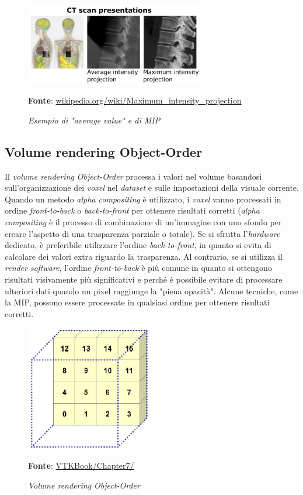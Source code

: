 \begin{figure}[h]
    \centering
    \includegraphics[width=0.7\textwidth]{immagini/volumerendering/mip.jpg}
    \caption{\textit{Esempio di "average value" e di MIP}}
    \textbf{Fonte}: \href{https://en.wikipedia.org/wiki/Maximum_intensity_projection}{wikipedia.org/wiki/Maximum\_intensity\_projection}
    \label{fig: Volume Rendering Example}
\end{figure}

\subsection{Volume rendering Object-Order}\label{sec:volume-object-order}
Il \emph{volume rendering Object-Order} processa i valori nel volume basandosi sull'organizzazione dei \emph{voxel} nel \emph{dataset} e sulle impostazioni della visuale corrente. Quando un metodo \emph{alpha compositing} è utilizzato, i \emph{voxel} vanno processati in ordine \emph{front-to-back} o \emph{back-to-front} per ottenere risultati corretti (\emph{alpha compositing} è il processo di combinazione di un'immagine con uno sfondo per creare l'aspetto di una trasparenza parziale o totale). Se si sfrutta l'\emph{hardware} dedicato, è preferibile utilizzare l'ordine \emph{back-to-front}, in quanto si evita di calcolare dei valori extra riguardo la trasparenza. Al contrario, se si utilizza il \emph{render} \emph{software}, l'ordine \emph{front-to-back} è più comune in quanto si ottengono risultati visivamente più significativi e perché è possibile evitare di processare ulteriori dati quando un pixel raggiunge la "piena opacità". Alcune tecniche, come la MIP, possono essere processate in qualsiasi ordine per ottenere risultati corretti.

\begin{figure}[h]
    \centering
    \includegraphics[width=0.5\textwidth]{immagini/volumerendering/objectorder.png}
    \caption{\textit{Volume rendering Object-Order}}
    \textbf{Fonte}: \href{https://lorensen.github.io/VTKExamples/site/VTKBook/07Chapter7/}{VTKBook/Chapter7/}
    \label{fig: Volume Rendering Object-Order}
\end{figure}

